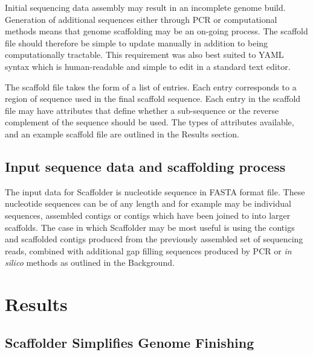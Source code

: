 \documentclass[10pt]{bmc_article}
\newenvironment{bmcformat}{\begin{raggedright}\baselineskip20pt\sloppy\setboolean{publ}{false}}{\end{raggedright}\baselineskip20pt\sloppy}
\begin{document}
\begin{bmcformat}
Initial sequencing data assembly may result in an incomplete genome build.
Generation of additional sequences either through PCR or computational methods
means that genome scaffolding may be an on-going process. The scaffold file
should therefore be simple to update manually in addition to being
computationally tractable. This requirement was also best suited to YAML
syntax which is human-readable and simple to edit in a standard text editor.
\pb

The scaffold file takes the form of a list of entries. Each entry corresponds
to a region of sequence used in the final scaffold sequence. Each entry in the
scaffold file may have attributes that define whether a sub-sequence or the
reverse complement of the sequence should be used. The types of attributes
available, and an example scaffold file are outlined in the Results section.
\pb

\subsection*{Input sequence data and scaffolding process} %

The input data for Scaffolder is nucleotide sequence in FASTA format file.
These nucleotide sequences can be of any length and for example may be
individual sequences, assembled contigs or contigs which have been joined to
into larger scaffolds. The case in which Scaffolder may be most useful is
using the contigs and scaffolded contigs produced from the previously
assembled set of sequencing reads, combined with additional gap filling
sequences produced by PCR or \emph{in silico} methods as outlined in the
Background. \pb


\clearpage

\section*{Results} %

\subsection*{Scaffolder Simplifies Genome Finishing} %


\end{bmcformat}
\end{document}
